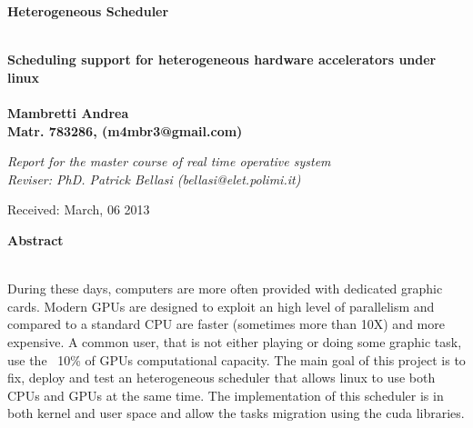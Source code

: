 \documentclass[a4paper,10pt]{article}
\newenvironment*{mytitle}{\begin{LARGE}\bf}{\end{LARGE}\\}%
\newenvironment*{mysubtitle}{\bf}{\\[1.5ex]}%
\newenvironment*{myabstract}{\begin{Large}\bf}{\end{Large}\\[2.5ex]}%
\begin{document}
\begin{mytitle}Heterogeneous Scheduler\end{mytitle}
\begin{mysubtitle}Scheduling support for heterogeneous hardware accelerators under linux\end{mysubtitle}
%
%
\\
Mambretti Andrea\\
Matr. 783286, (m4mbr3@gmail.com)\\
\begin{flushright}
\emph{Report for the master course of real time operative system}\\
\emph{Reviser: PhD. Patrick Bellasi (bellasi@elet.polimi.it)}
\end{flushright}

Received: March, 06 2013\\
\hspace{10ex}

\begin{myabstract} Abstract \end{myabstract}
During these days, computers are more often provided with dedicated graphic cards. Modern GPUs are
designed to exploit an high level of parallelism and compared to a standard CPU are faster
(sometimes more than 10X) and more expensive. 
A common user, that is not either playing or doing some graphic task, use the ~10\% of GPUs 
computational capacity. The main goal of this project is to fix, deploy and test an heterogeneous 
scheduler that allows linux to use both CPUs and GPUs at the same time. The implementation of this 
scheduler is in both kernel and user space and allow the tasks migration using the cuda libraries.
\end{document}
